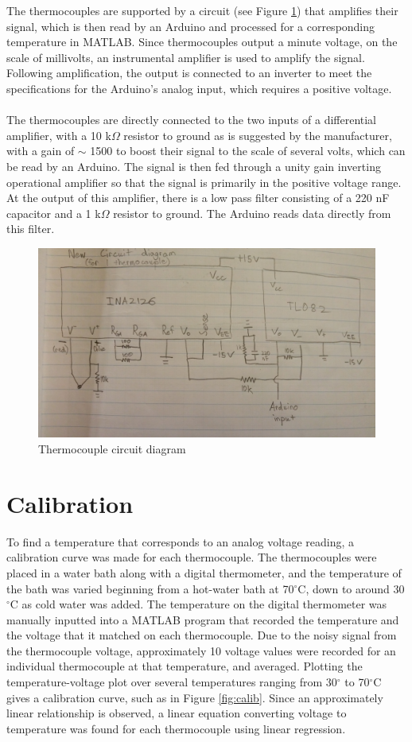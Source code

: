\documentclass[letterpaper,titlepage,oneside]{report}
\begin{document}
The thermocouples are supported by a circuit
(see Figure \ref{fig:circuit}) that amplifies their
signal, which is then read by an Arduino and processed for a
corresponding temperature in MATLAB. Since thermocouples output
a minute voltage, on the scale of millivolts, an instrumental
amplifier is used to amplify the signal. Following amplification,
the output is connected to an inverter to meet the specifications
for the Arduino's analog input, which requires a positive voltage. 
\\\\
The thermocouples are directly connected to the two inputs of a
differential amplifier, with a 10 k$\Omega$ resistor to ground as is
suggested by the manufacturer, with a gain of $\sim$ 1500 to
boost their signal to the scale of several volts, which can be
read by an Arduino. The signal is then fed through a unity
gain inverting operational amplifier so that the signal is
primarily in the positive voltage range. At the output of this
amplifier, there is a low pass filter consisting of a 220 nF
capacitor and a 1 k$\Omega$ resistor to ground. The Arduino
reads data directly from this filter.

\begin{figure}[ht]
  \centering
  \includegraphics[width=.75\textwidth]{circuit}
  \caption{Thermocouple circuit diagram}
  \label{fig:circuit}
\end{figure}

\section{Calibration}
To find a temperature that corresponds to an analog voltage
reading, a calibration curve was made for each thermocouple.
The thermocouples were placed in a water bath along with a
digital thermometer, and the temperature of the bath was varied
beginning from a hot-water bath at 70$^{\circ}$C, down to around
30$^{\circ}$C as cold water was added. The temperature on the
digital thermometer was manually inputted into a MATLAB program
that recorded the temperature and the voltage that it matched
on each thermocouple. Due to the noisy signal from the
thermocouple voltage, approximately 10 voltage values were
recorded for an individual thermocouple at that temperature,
and averaged. Plotting the temperature-voltage plot over several
temperatures ranging from 30$^{\circ}$ to 70$^{\circ}$C gives a
calibration curve, such as in Figure \ref{fig:calib}.  
Since an approximately linear relationship is observed, a
linear equation converting voltage to temperature was
found for each thermocouple using linear regression.
\end{document}
